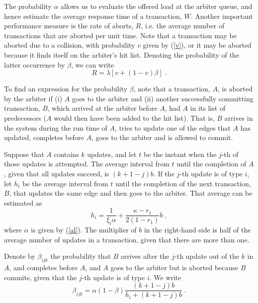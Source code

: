 \documentclass[runningheads]{llncs}
\begin{document}
The probability $\alpha$ allows us to evaluate the offered load at the arbiter
queue, and hence estimate the average response time of a transaction, $W$.
Another important performance measure is the rate of aborts, $R$, i.e. the
average number of transactions that are aborted per unit time. Note that a
transaction may be aborted due to a collision, with probability $v$ given by
(\ref{v}), or it may be aborted because it finds itself on the arbiter's hit
list. Denoting the probability of the latter occurrence by $\beta$, we can
write
\begin{equation} \label{R}
R = \lambda [v + (1-v)\beta]\;.
\end{equation}

To find an expression for the probability $\beta$, note that a transaction, $A$,
is aborted by the arbiter if (i) $A$ goes to the arbiter and (ii) another
successfully committing transaction, $B$, which arrived at the arbiter before $A$,
had $A$ in its list of predecessors ($A$ would then have been  added to the hit
list). That is, $B$ arrives in the system during the run time of $A$, tries to
update one of the edges that $A$ has updated, completes before $A$, goes to the
arbiter and is allowed to commit.

Suppose that $A$ contains $k$ updates, and let $t$ be the instant when the
$j$-th of those updates is attempted. The average interval from $t$ until the
completion of $A$, given that all updates succeed, is $(k+1-j)b$. If the $j$-th
update is of type $i$, let $h_i$ be the average interval from $t$ until the
completion of the next transaction, $B$, that updates the same edge and then
goes to the arbiter. That average can be estimated as
\begin{equation} \label{hi}
h_i = \frac{1}{\xi_i\alpha} + \frac{\kappa - r_1}{2(1-r_1)} b\;,
\end{equation}
where $\alpha$ is given by (\ref{al}). The multiplier of $b$ in the right-hand
side is half of the average number of updates in a transaction, given that
there are more than one.

Denote by $\beta_{ijk}$ the probability that $B$ arrives after the $j$-th
update out of the $k$ in $A$, and completes before $A$, and $A$ goes to the
arbiter but is aborted because $B$ commits, given that the $j$-th update is
of type $i$. We write
\begin{equation} \label{bijk}
\beta_{ijk} = \alpha (1-\beta )\frac{(k+1-j)b}{h_i + (k+1-j)b}\;.
\end{equation}
\end{document}
